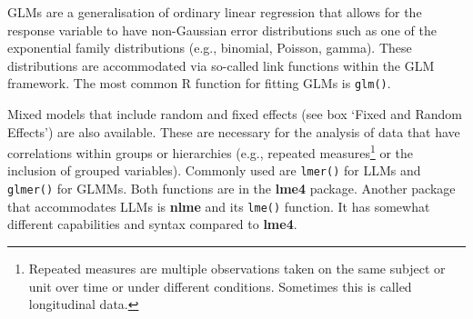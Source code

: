 \documentclass[
  letterpaper,
]{book}
\begin{document}
GLMs are a generalisation of ordinary linear regression that allows for
the response variable to have non-Gaussian error distributions such as
one of the exponential family distributions (e.g., binomial, Poisson,
gamma). These distributions are accommodated via so-called link
functions within the GLM framework. The most common R function for
fitting GLMs is \texttt{glm()}.

Mixed models that include random and fixed effects (see box `Fixed and
Random Effects') are also available. These are necessary for the
analysis of data that have correlations within groups or hierarchies
(e.g., repeated measures\footnote{Repeated measures are multiple
  observations taken on the same subject or unit over time or under
  different conditions. Sometimes this is called longitudinal data.} or
the inclusion of grouped variables). Commonly used are \texttt{lmer()}
for LLMs and \texttt{glmer()} for GLMMs. Both functions are in the
\textbf{lme4} package. Another package that accommodates LLMs is
\textbf{nlme} and its \texttt{lme()} function. It has somewhat different
capabilities and syntax compared to \textbf{lme4}.
\end{document}
